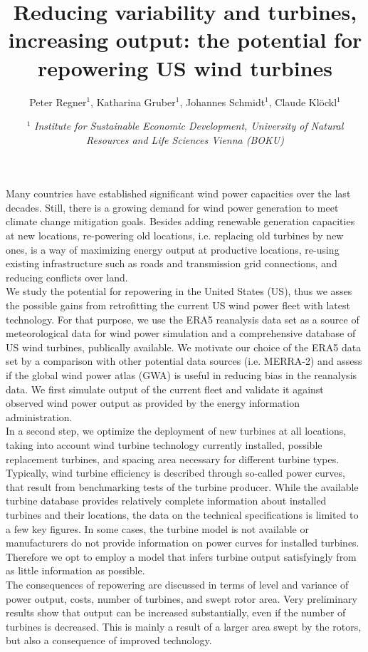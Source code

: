 \documentclass{article}
\title{Reducing variability and turbines, increasing output: the potential for repowering US wind turbines}
\author{\small{Peter Regner$^{1}$, Katharina Gruber$^{1}$, Johannes Schmidt$^{1}$, Claude Kl\"ockl$^{1}$}}
\date{$^{1}$ \small{\textit{Institute for Sustainable Economic Development,
University of Natural Resources and Life Sciences Vienna (BOKU)}}}
\begin{document}
\maketitle

\small{
Many countries have established significant wind power capacities over the last decades. Still, there is a growing demand for wind power generation to meet climate change mitigation goals. Besides adding renewable generation capacities at new locations, re-powering old locations, i.e. replacing old turbines by new ones, is a way of maximizing energy output at productive locations, re-using existing infrastructure such as roads and transmission grid connections, and reducing conflicts over land.\\

We study the potential for repowering in the United States (US), thus we asses the possible gains from retrofitting the current US wind power fleet with latest technology. For that purpose, we use the ERA5 reanalysis data set as a source of meteorological data for wind power simulation and a comprehensive database of US wind turbines, publically available. We motivate our choice of the ERA5 data set by a comparison with other potential data sources (i.e. MERRA-2) and assess if the global wind power atlas (GWA) is useful in reducing bias in the reanalysis data. We first simulate output of the current fleet and validate it against observed wind power output as provided by the energy information administration.\\

In a second step, we optimize the deployment of new turbines at all locations, taking into account wind turbine technology currently installed, possible replacement turbines, and spacing area necessary for different turbine types. Typically, wind turbine efficiency is described through so-called power curves, that result from benchmarking tests of the turbine producer. While the available turbine database provides relatively complete information about installed turbines and their locations, the data on the technical specifications is limited to a few key figures. In some cases, the turbine model is not available or manufacturers do not provide information on power curves for installed turbines. Therefore we opt to employ a model that infers turbine output satisfyingly from as little information as possible. \\

The consequences of repowering are discussed in terms of level and variance of power output, costs, number of turbines, and swept rotor area. Very preliminary results show that output can be increased substantially, even if the number of turbines is decreased. This is mainly a result of a larger area swept by the rotors, but also a consequence of improved technology.
}
\end{document}
